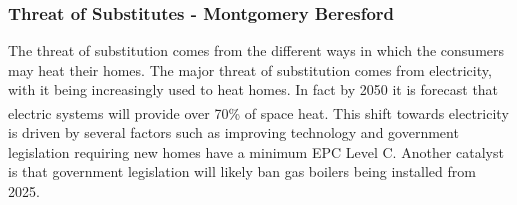 \documentclass[11pt]{article}		%
\newcommand{\supercite}[1]{\textsuperscript{\cite{#1}}}		%
\begin{document}

        \subsubsection[Threat of Substitutes]{Threat of Substitutes - Montgomery Beresford} \label{customerSubstitutes}
        
                 The threat of substitution comes from the different ways in which the consumers may heat their homes. The major threat of substitution comes from electricity, with it being increasingly used to heat homes. In fact by 2050 it is forecast that electric systems will provide over 70\% of space heat\supercite{heating_tech}. This shift towards electricity is driven by several factors such as improving technology and government legislation requiring new homes have a minimum EPC Level C. Another catalyst is that government legislation will likely ban gas boilers being installed from 2025.%
\end{document}
